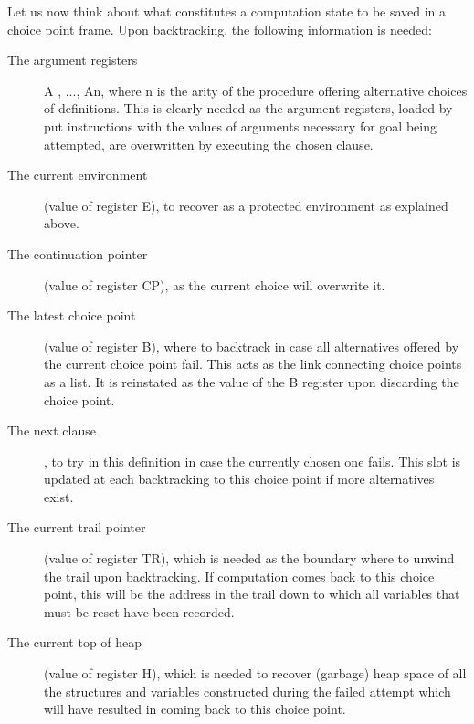 Let us now think about what constitutes a computation state to be saved in a choice
point frame. Upon backtracking, the following information is needed:
\begin{description}
\item[The argument registers] A
, ..., An, where n is the arity of the procedure offering
alternative choices of definitions. This is clearly needed as the argument registers,
loaded by put instructions with the values of arguments necessary for goal being
attempted, are overwritten by executing the chosen clause.
\item[The current environment] (value of register E), to recover as a protected environment
as explained above.
\item[The continuation pointer] (value of register CP), as the current choice will overwrite
it.
\item[The latest choice point] (value of register B), where to backtrack in case all alternatives
offered by the current choice point fail. This acts as the link connecting
choice points as a list. It is reinstated as the value of the B register upon discarding
the choice point.
\item[The next clause], to try in this definition in case the currently chosen one fails.
This slot is updated at each backtracking to this choice point if more alternatives
exist.
\item[The current trail pointer] (value of register TR), which is needed as the boundary
where to unwind the trail upon backtracking. If computation comes back to this
choice point, this will be the address in the trail down to which all variables that
must be reset have been recorded.
\item[The current top of heap] (value of register H), which is needed to recover (garbage)
heap space of all the structures and variables constructed during the failed attempt
which will have resulted in coming back to this choice point.
\end{description}

